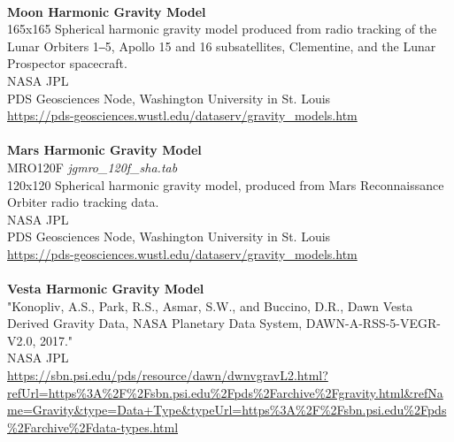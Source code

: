 \documentclass[Orbiter User Manual.tex]{subfiles}
\begin{document}
\\
\textbf{Moon Harmonic Gravity Model}\\
165x165 Spherical harmonic gravity model produced from radio tracking of the Lunar Orbiters 1‒5, Apollo 15 and 16 subsatellites, Clementine, and the Lunar Prospector spacecraft.\\
NASA JPL\\
PDS Geosciences Node, Washington University in St. Louis\\
\url{https://pds-geosciences.wustl.edu/dataserv/gravity_models.htm}\\
\\
\textbf{Mars Harmonic Gravity Model}\\
MRO120F	\textit{jgmro\_120f\_sha.tab}\\
120x120 Spherical harmonic gravity model, produced from Mars Reconnaissance Orbiter radio tracking data.\\
NASA JPL\\
PDS Geosciences Node, Washington University in St. Louis\\
\url{https://pds-geosciences.wustl.edu/dataserv/gravity_models.htm}\\
\\
\textbf{Vesta Harmonic Gravity Model}\\
"Konopliv, A.S., Park, R.S., Asmar, S.W., and Buccino, D.R., Dawn Vesta Derived Gravity Data, NASA Planetary Data System, DAWN-A-RSS-5-VEGR-V2.0, 2017."\\
NASA JPL\\
\url{https://sbn.psi.edu/pds/resource/dawn/dwnvgravL2.html?refUrl=https\%3A\%2F\%2Fsbn.psi.edu\%2Fpds\%2Farchive\%2Fgravity.html&refName=Gravity&type=Data+Type&typeUrl=https\%3A\%2F\%2Fsbn.psi.edu\%2Fpds\%2Farchive\%2Fdata-types.html}\\
\\
\end{document}
